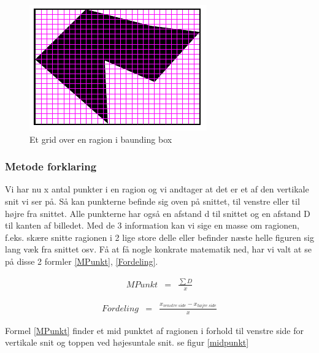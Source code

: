 \begin{figure}[h]
	\begin{center}
		\includegraphics[scale=0.76,angle=0]{afsnit/vores_implementation/billeder/udvidet_loesning/udvidetloesninglayer.png}
	\end{center}
	\caption[]{Et grid over en ragion i baunding box}
	\label{grid}
\end{figure}

\subsubsection{Metode forklaring}
Vi har nu x antal punkter i en ragion og vi andtager at det er et af den
vertikale snit vi ser på. Så kan punkterne befinde sig oven på snittet,
til venstre eller til højre fra snittet. Alle punkterne har også en
afstand d til snittet og en afstand D til kanten af billedet. Med de 3
information kan vi sige en masse om ragionen, f.eks. skære snitte
ragionen i 2 lige store delle eller befinder næste helle figuren sig
lang væk fra snittet osv. Få at få nogle konkrate matematik ned, har vi
valt at se på disse 2 formler
\ref{MPunkt}, \ref{Fordeling}.

\begin{eqnarray} 
 MPunkt &=& \frac {\sum{D}}{x}\label{MPunkt}
\end{eqnarray}

\begin{eqnarray} 
 Fordeling &=& \frac{x_{venstre~side}-x_{højre~side}}{x}\label{Fordeling}
\end{eqnarray}

Formel \ref{MPunkt} finder et mid punktet af ragionen i forhold til
venstre side for vertikale snit og toppen ved højesuntale snit. se figur
\ref{midpunkt}

